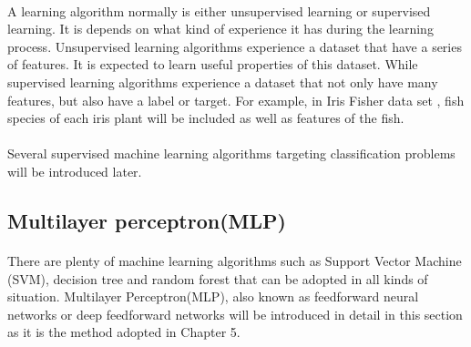 \paragraph{}
A learning algorithm normally is either unsupervised learning or supervised learning.
It is depends on what kind of experience it has during the learning process.
Unsupervised learning algorithms experience a dataset that have a series of features.
It is expected to learn useful properties of this dataset.
While supervised learning algorithms experience a dataset that not only have many features, but also have a label or target.
For example, in Iris Fisher data set \citep{Fisher1936}, fish species of each iris plant will be included as well as features of the fish. 

\paragraph{}
Several supervised machine learning algorithms targeting classification problems will be introduced later.

\subsection{Multilayer perceptron(MLP)}
\paragraph{}
There are plenty of machine learning algorithms such as Support Vector Machine (SVM)\citep{Boser1996,Cortes1995}, decision tree\citep{Olshen1984} and random forest\citep{Ho1995} that can be adopted in all kinds of situation.
Multilayer Perceptron(MLP), also known as feedforward neural networks or deep feedforward networks will be introduced in detail in this section as it is the method adopted in Chapter 5.

